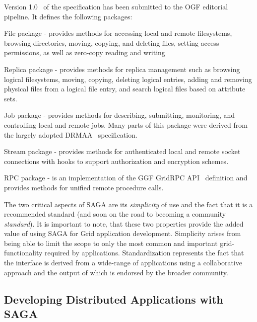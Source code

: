 \documentclass[conference,final]{IEEEtran}
\newcommand{\up}{\vspace*{-1em}}
\begin{document}
\noindent Version 1.0~\cite{saga-core} of the specification has been submitted
to the OGF editorial pipeline.  It defines the following packages:
\begin{compactitem}
\item File package - provides methods for accessing local and remote
  filesystems, browsing directories, moving, copying, and deleting
  files, setting access permissions, as well as zero-copy reading and
  writing
\item Replica package - provides methods for replica management such
  as browsing logical filesystems, moving, copying, deleting logical
  entries, adding and removing physical files from a logical file
  entry, and search logical files based on attribute sets.
\item Job package - provides methods for describing, submitting,
  monitoring, and controlling local and remote jobs. Many parts of
  this package were derived from the largely adopted
  DRMAA~\cite{drmaa_url} specification.
\item Stream package - provides methods for authenticated local and
  remote socket connections with hooks to support authorization and
  encryption schemes.
\item RPC package - is an implementation of the GGF GridRPC
  API~\cite{gridrpc_url} definition and provides methods for unified
  remote procedure calls.
\end{compactitem}

The two critical aspects of SAGA are its {\it simplicity} of use and
the fact that it is a recommended standard (and soon on the road to
becoming a community {\it standard}).  It is important to note, that
these two properties provide the added value of using SAGA for Grid
application development.  Simplicity arises from being able to limit
the scope to only the most common and important grid-functionality
required by applications.  Standardization represents the fact that
the interface is derived from a wide-range of applications using a
collaborative approach and the output of which is endorsed by the
broader community.

\up

\subsection{Developing Distributed Applications with SAGA}

\up
\end{document}

